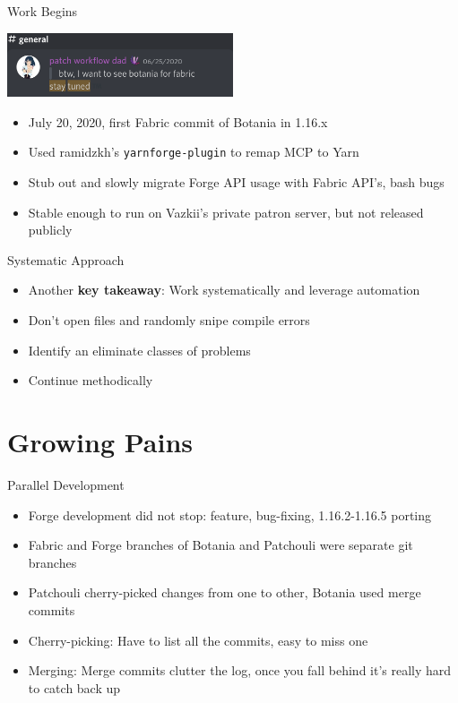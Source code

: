 \documentclass{beamer}
\begin{document}
\begin{frame}{Work Begins}
  \begin{center}
    \includegraphics[width=0.5\textwidth]{stay_tuned.png}
  \end{center}

  \begin{itemize}
  \item July 20, 2020, first Fabric commit of Botania in 1.16.x
  \item Used ramidzkh's \texttt{yarnforge-plugin} to remap MCP to Yarn
  \item Stub out and slowly migrate Forge API usage with Fabric API's, bash bugs
  \item Stable enough to run on Vazkii's private patron server, but not released publicly
  \end{itemize}
\end{frame}

\begin{frame}{Systematic Approach}
  \begin{itemize}
  \item Another \textbf{key takeaway}: Work systematically and leverage automation
  \item Don't open files and randomly snipe compile errors
  \item Identify an eliminate classes of problems
  \item Continue methodically
  \end{itemize}
\end{frame}

\section{Growing Pains}
\begin{frame}{Parallel Development}
  \begin{itemize}
  \item Forge development did not stop: feature, bug-fixing, 1.16.2-1.16.5 porting
  \item Fabric and Forge branches of Botania and Patchouli were separate git branches
  \item Patchouli cherry-picked changes from one to other, Botania used merge commits
  \item Cherry-picking: Have to list all the commits, easy to miss one
  \item Merging: Merge commits clutter the log, once you fall behind it's really hard
    to catch back up
  \end{itemize}
\end{frame}
\end{document}
